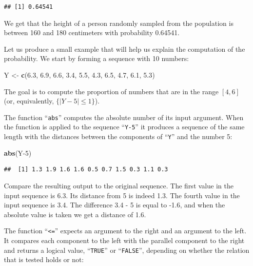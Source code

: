 \documentclass[
]{krantz}
\makeatletter
\newenvironment{Shaded}{\begin{snugshade}}{\end{snugshade}}
\newcommand{\DecValTok}[1]{\textcolor[rgb]{0.00,0.00,0.81}{#1}}
\newcommand{\FloatTok}[1]{\textcolor[rgb]{0.00,0.00,0.81}{#1}}
\newcommand{\KeywordTok}[1]{\textcolor[rgb]{0.13,0.29,0.53}{\textbf{#1}}}
\newcommand{\NormalTok}[1]{#1}
\newcommand{\StringTok}[1]{\textcolor[rgb]{0.31,0.60,0.02}{#1}}
\newenvironment{kframe}{%
\medskip{}
\setlength{\fboxsep}{.8em}
 \def\at@end@of@kframe{}%
 \ifinner\ifhmode%
  \def\at@end@of@kframe{\end{minipage}}%
  \begin{minipage}{\columnwidth}%
 \fi\fi%
 \def\FrameCommand##1{\hskip\@totalleftmargin \hskip-\fboxsep
 \colorbox{shadecolor}{##1}\hskip-\fboxsep
     \hskip-\linewidth \hskip-\@totalleftmargin \hskip\columnwidth}%
 \MakeFramed {\advance\hsize-\width
   \@totalleftmargin\z@ \linewidth\hsize
   \@setminipage}}%
 {\par\unskip\endMakeFramed%
 \at@end@of@kframe}
\renewenvironment{Shaded}{\begin{kframe}}{\end{kframe}}
\theoremstyle{definition}
\theoremstyle{definition}
\theoremstyle{definition}
\theoremstyle{remark}
\makeatother
\begin{document}
\begin{verbatim}
## [1] 0.64541
\end{verbatim}

We get that the height of a person randomly sampled from the population
is between 160 and 180 centimeters with probability 0.64541.

Let us produce a small example that will help us explain the computation
of the probability. We start by forming a sequence with 10 numbers:

\begin{Shaded}
\begin{Highlighting}[]
\NormalTok{Y <-}\StringTok{ }\KeywordTok{c}\NormalTok{(}\FloatTok{6.3}\NormalTok{, }\FloatTok{6.9}\NormalTok{, }\FloatTok{6.6}\NormalTok{, }\FloatTok{3.4}\NormalTok{, }\FloatTok{5.5}\NormalTok{, }\FloatTok{4.3}\NormalTok{, }\FloatTok{6.5}\NormalTok{, }\FloatTok{4.7}\NormalTok{, }\FloatTok{6.1}\NormalTok{, }\FloatTok{5.3}\NormalTok{)}
\end{Highlighting}
\end{Shaded}

The goal is to compute the proportion of numbers that are in the range
\([4,6]\) (or, equivalently, \(\{|Y-5| \leq 1\}\)).

The function ``\texttt{abs}'' computes the absolute number of its input argument.
When the function is applied to the sequence ``\texttt{Y-5}'' it produces a
sequence of the same length with the distances between the components of
``\texttt{Y}'' and the number 5:

\begin{Shaded}
\begin{Highlighting}[]
\KeywordTok{abs}\NormalTok{(Y}\DecValTok{-5}\NormalTok{)}
\end{Highlighting}
\end{Shaded}

\begin{verbatim}
##  [1] 1.3 1.9 1.6 1.6 0.5 0.7 1.5 0.3 1.1 0.3
\end{verbatim}

Compare the resulting output to the original sequence. The first value
in the input sequence is 6.3. Its distance from 5 is indeed 1.3. The
fourth value in the input sequence is 3.4. The difference 3.4 - 5 is
equal to -1.6, and when the absolute value is taken we get a distance of
1.6.

The function ``\texttt{\textless{}=}'' expects an argument to the right and an argument to
the left. It compares each component to the left with the parallel
component to the right and returns a logical value, ``\texttt{TRUE}'' or
``\texttt{FALSE}'', depending on whether the relation that is tested holds or
not:
\end{document}
